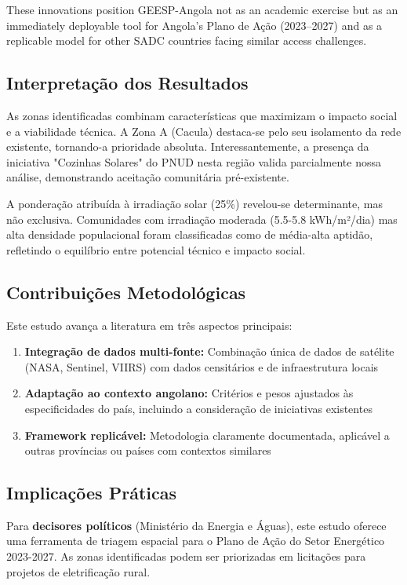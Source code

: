 \documentclass[12pt, a4paper]{article}
\begin{document}
These innovations position GEESP-Angola not as an academic exercise but as an immediately deployable tool for Angola's Plano de Ação (2023--2027) and as a replicable model for other SADC countries facing similar access challenges.
\subsection{Interpretação dos Resultados}

As zonas identificadas combinam características que maximizam o impacto social e a viabilidade técnica. A Zona A (Cacula) destaca-se pelo seu isolamento da rede existente, tornando-a prioridade absoluta. Interessantemente, a presença da iniciativa "Cozinhas Solares" do PNUD nesta região valida parcialmente nossa análise, demonstrando aceitação comunitária pré-existente.

A ponderação atribuída à irradiação solar (25\%) revelou-se determinante, mas não exclusiva. Comunidades com irradiação moderada (5.5-5.8 kWh/m²/dia) mas alta densidade populacional foram classificadas como de média-alta aptidão, refletindo o equilíbrio entre potencial técnico e impacto social.

\subsection{Contribuições Metodológicas}

Este estudo avança a literatura em três aspectos principais:
\begin{enumerate}
    \item \textbf{Integração de dados multi-fonte:} Combinação única de dados de satélite (NASA, Sentinel, VIIRS) com dados censitários e de infraestrutura locais
    \item \textbf{Adaptação ao contexto angolano:} Critérios e pesos ajustados às especificidades do país, incluindo a consideração de iniciativas existentes
    \item \textbf{Framework replicável:} Metodologia claramente documentada, aplicável a outras províncias ou países com contextos similares
\end{enumerate}

\subsection{Implicações Práticas}

Para \textbf{decisores políticos} (Ministério da Energia e Águas), este estudo oferece uma ferramenta de triagem espacial para o Plano de Ação do Setor Energético 2023-2027. As zonas identificadas podem ser priorizadas em licitações para projetos de eletrificação rural.
\end{document}
